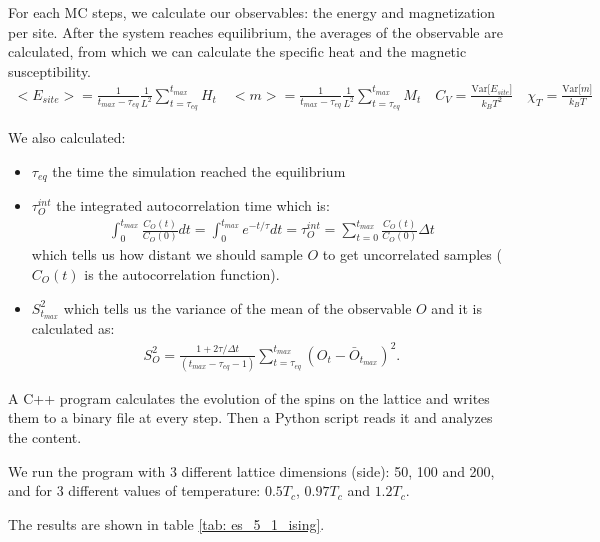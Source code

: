 \documentclass[../main.tex]{subfiles}
\begin{document}
For each MC steps, we calculate our observables: the energy and magnetization per site. After the system reaches equilibrium, the averages of the observable are calculated, from which we can calculate the specific heat and the magnetic susceptibility.
\begin{align}
    <E_{site}> = \frac{1}{t_{max}-\tau_{eq}}\frac{1}{L^2} \sum_{t=\tau_{eq}}^{t_{max}} H_t
    \quad <m> = \frac{1}{t_{max}-\tau_{eq}}\frac{1}{L^2} \sum_{t=\tau_{eq}}^{t_{max}} M_t
    \quad C_V = \frac{\text{Var[$E_{site}$]}}{k_B T^2}
    \quad \chi_T = \frac{\text{Var[$m$]}}{k_B T}
\end{align}

We also calculated:
\begin{itemize}
    \item $\tau_{eq}$ the time the simulation reached the equilibrium
    \item $\tau_O^{int}$ the integrated autocorrelation time which is:
    \begin{align} 
        \int_{0}^{t_{max}} \frac{C_O(t)}{C_O(0)} dt = \int_{0}^{t_{max}} e^{-t/\tau} dt = \tau_O^{int} = \sum_{t=0}^{t_{max}} \frac{C_O(t)}{C_O(0)}\Delta t
    \end{align}
    which tells us how distant we should sample $O$ to get uncorrelated samples ($C_O(t)$ is the autocorrelation function).
    \item $S_{t_{max}}^2$ which tells us the variance of the mean of the observable $O$ and it is calculated as: \begin{align} 
        S_{O}^2 = \frac{1+2\tau / \Delta t}{(t_{max} - \tau_{eq} - 1)} \sum_{t=\tau_{eq}}^{t_{max}} (O_t - \bar{O}_{t_{max}})^2.
    \end{align}
\end{itemize}

A C++ program calculates the evolution of the spins on the lattice and writes them to a binary file at every step. Then a Python script reads it and analyzes the content.

We run the program with 3 different lattice dimensions (side): 50, 100 and 200, and for 3 different values of temperature: $0.5T_c$, $0.97T_c$ and $1.2T_c$.

The results are shown in table \ref{tab: es_5_1_ising}.
\end{document}
